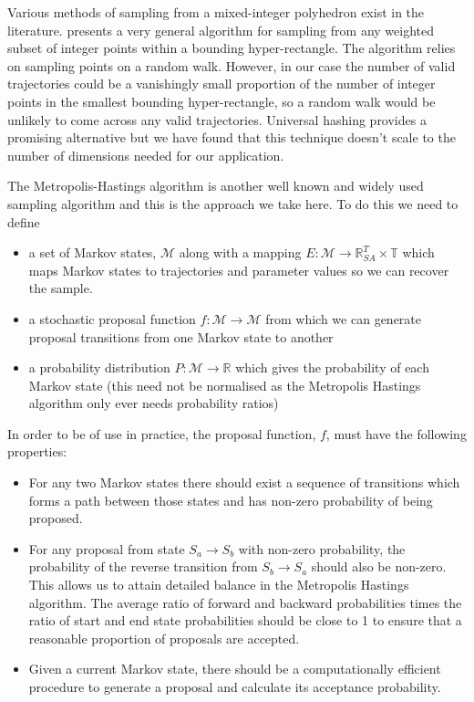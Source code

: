 \documentclass{article}
\begin{document}
Various methods of sampling from a mixed-integer polyhedron exist in the literature. \citet{baumert2009discrete} presents a very general algorithm for sampling from any weighted subset of integer points within a bounding hyper-rectangle. The algorithm relies on sampling points on a random walk. However, in our case the number of valid trajectories could be a vanishingly small proportion of the number of integer points in the smallest bounding hyper-rectangle, so a random walk would be unlikely to come across any valid trajectories. Universal hashing \citep{meel2016constrained} provides a promising alternative but we have found that this technique doesn't scale to the number of dimensions needed for our application.

The Metropolis-Hastings algorithm is another well known and widely used sampling algorithm and this is the approach we take here. To do this we need to define
\begin{itemize}
\item a set of Markov states, $\mathcal{M}$ along with a mapping $E:\mathcal{M} \to \mathbb{R}^T_{SA} \times \mathbb{T}$ which maps Markov states to trajectories and parameter values so we can recover the sample.

\item a stochastic proposal function $f:\mathcal{M} \to \mathcal{M}$ from which we can generate proposal transitions from one Markov state to another

\item a probability distribution $P: \mathcal{M} \to \mathbb{R}$ which gives the probability of each Markov state (this need not be normalised as the Metropolis Hastings algorithm only ever needs probability ratios)

\end{itemize}

In order to be of use in practice, the proposal function, $f$, must have the following properties:
\begin{itemize}
	\item For any two Markov states there should exist a sequence of transitions which forms a path between those states and has non-zero probability of being proposed.
	
	\item For any proposal from state $S_a \to S_b$ with non-zero probability, the probability of the reverse transition from $S_b \to S_a$ should also be non-zero. This allows us to attain detailed balance in the Metropolis Hastings algorithm. The average ratio of forward and backward probabilities times the ratio of start and end state probabilities should be close to 1 to ensure that a reasonable proportion of proposals are accepted.
	
	\item Given a current Markov state, there should be a computationally efficient procedure to generate a proposal and calculate its acceptance probability. 
\end{itemize}
\end{document}
